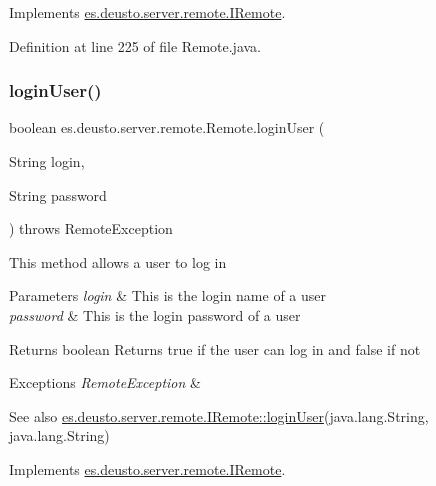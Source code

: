 Implements \hyperlink{interfacees_1_1deusto_1_1server_1_1remote_1_1_i_remote_a488f8b57271876e219af445345428d73}{es.\+deusto.\+server.\+remote.\+I\+Remote}.



Definition at line 225 of file Remote.\+java.

\mbox{\label{classes_1_1deusto_1_1server_1_1remote_1_1_remote_a1c8e0153dd9b3f6d5499eb6d01e48bbe}} 
\subsubsection{\texorpdfstring{login\+User()}{loginUser()}}
{\footnotesize\ttfamily boolean es.\+deusto.\+server.\+remote.\+Remote.\+login\+User (\begin{DoxyParamCaption}\item[{String}]{login,  }\item[{String}]{password }\end{DoxyParamCaption}) throws Remote\+Exception}

This method allows a user to log in 
\begin{DoxyParams}{Parameters}
{\em login} & This is the login name of a user \\
\hline
{\em password} & This is the login password of a user \\
\hline
\end{DoxyParams}
\begin{DoxyReturn}{Returns}
boolean Returns true if the user can log in and false if not 
\end{DoxyReturn}

\begin{DoxyExceptions}{Exceptions}
{\em Remote\+Exception} & \\
\hline
\end{DoxyExceptions}
\begin{DoxySeeAlso}{See also}
\hyperlink{interfacees_1_1deusto_1_1server_1_1remote_1_1_i_remote_a19acdbd6565b0f00cbe860a3316071ad}{es.\+deusto.\+server.\+remote.\+I\+Remote\+::login\+User}(java.\+lang.\+String, java.\+lang.\+String) 
\end{DoxySeeAlso}


Implements \hyperlink{interfacees_1_1deusto_1_1server_1_1remote_1_1_i_remote_a19acdbd6565b0f00cbe860a3316071ad}{es.\+deusto.\+server.\+remote.\+I\+Remote}.



